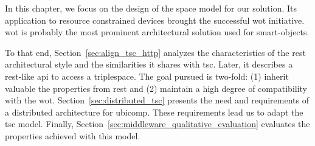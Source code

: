 In this chapter, we focus on the design of the space model for our solution.
Its application to resource constrained devices brought the successful \ac{wot} initiative.
\ac{wot} is probably the most prominent architectural solution used for smart-objects. %


To that end, Section~\ref{sec:align_tsc_http} analyzes the characteristics of the \ac{rest} architectural style and the similarities it shares with \ac{tsc}.
Later, it describes a \ac{rest}-like \ac{api} to access a triplespace. %
The goal pursued is two-fold: (1) inherit valuable the properties from \ac{rest} and (2) maintain a high degree of compatibility with the \ac{wot}.
Section~\ref{sec:distributed_tsc} presents the need and requirements of a distributed architecture for \ac{ubicomp}.
These requirements lead us to adapt the \ac{tsc} model.
Finally, Section~\ref{sec:middleware_qualitative_evaluation} evaluates the properties achieved with this model.





